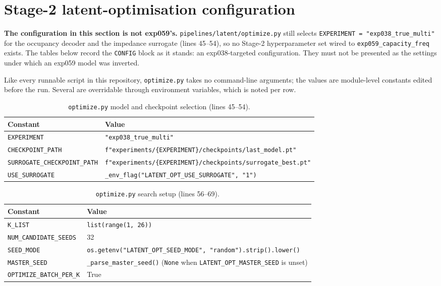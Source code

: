 \section{Stage-2 latent-optimisation configuration}
\label{sec:appb_stage2}

\textbf{The configuration in this section is not exp059's.}
\texttt{pipelines/latent/optimize.py} still selects \texttt{EXPERIMENT =
"exp038\_true\_multi"} for the occupancy decoder and the impedance surrogate (lines
45--54), so no Stage-2 hyperparameter set wired to \texttt{exp059\_capacity\_freq} exists.
The tables below record the \texttt{CONFIG} block as it stands: an exp038-targeted
configuration. They must not be presented as the settings under which an exp059 model was
inverted.

Like every runnable script in this repository, \texttt{optimize.py} takes no command-line
arguments; the values are module-level constants edited before the run. Several are
overridable through environment variables, which is noted per row.

\begin{table}[htbp]
\centering
\caption{\texttt{optimize.py} model and checkpoint selection (lines 45--54).}
\label{tab:appb_opt_model}
\begin{tabular}{@{}lp{}@{}}
\hline
Constant & Value \\
\hline
\texttt{EXPERIMENT} & \texttt{"exp038\_true\_multi"} \\
\texttt{CHECKPOINT\_PATH} & \texttt{f"experiments/\{EXPERIMENT\}/\allowbreak checkpoints/last\_model.pt"} \\
\texttt{SURROGATE\_CHECKPOINT\_PATH} & \texttt{f"experiments/\{EXPERIMENT\}/\allowbreak checkpoints/surrogate\_best.pt"} \\
\texttt{USE\_SURROGATE} & \texttt{\_env\_flag("LATENT\_OPT\_USE\_SURROGATE", "1")} \\
\hline
\end{tabular}
\end{table}

\begin{table}[htbp]
\centering
\caption{\texttt{optimize.py} search setup (lines 56--69).}
\label{tab:appb_opt_search}
\begin{tabular}{@{}lp{}@{}}
\hline
Constant & Value \\
\hline
\texttt{K\_LIST} & \texttt{list(range(1, 26))} \\
\texttt{NUM\_CANDIDATE\_SEEDS} & 32 \\
\texttt{SEED\_MODE} & \texttt{os.getenv("LATENT\_OPT\_SEED\_MODE", "random").strip().lower()} \\
\texttt{MASTER\_SEED} & \texttt{\_parse\_master\_seed()} (\texttt{None} when \texttt{LATENT\_OPT\_MASTER\_SEED} is unset) \\
\texttt{OPTIMIZE\_BATCH\_PER\_K} & True \\
\hline
\end{tabular}
\end{table}

